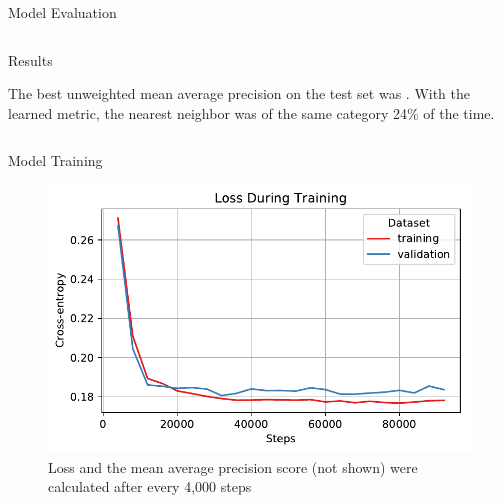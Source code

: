 \documentclass[final]{beamer}
\newlength{\onecolwid}
\newlength{\twocolwid}
\begin{document}
\begin{frame}[t]
\begin{columns}[t]
\begin{column}{\twocolwid}
\begin{columns}[t,totalwidth=\twocolwid]
\begin{column}{\onecolwid}
\begin{block}{Model Evaluation}
\end{block}


\end{column} %

\end{columns} %


\begin{alertblock}{Results}

  The best unweighted mean average precision on the test set was
  . With the
  learned metric, the nearest neighbor was of the same category 24\% of the
  time.
\end{alertblock} 


\begin{columns}[t,totalwidth=\twocolwid] %

  \begin{column}{\onecolwid} %
    
    \begin{block}{Model Training}

      \begin{figure}
        \centering
        \includegraphics[scale=1.5]{../project/object_detection/training_loss.pdf}
        \caption{Loss and the mean average precision score (not shown) were
          calculated after every 4,000 steps}
        \label{fig:training_loss}
      \end{figure}


\end{block}
\end{column}
\end{columns}
\end{column}
\end{columns}
\end{frame}
\end{document}
